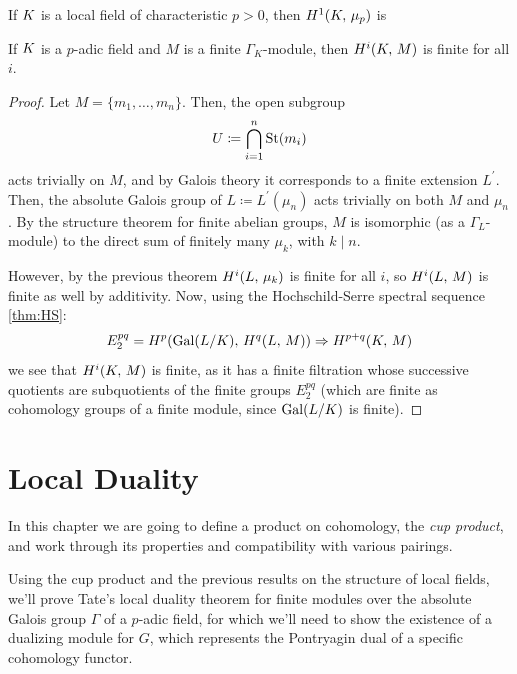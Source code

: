 \documentclass[a4paper, oneside]{memoir}
\begin{document}
\begin{remark}\label{rm:H1CharP}
    If $K$ is a local field of characteristic $p>0$, then $H^{1}( K, \, \mu_p )$ is
\end{remark}

\begin{corollary}\label{cor:FinCohom}
    If $K$ is a $p$-adic field and $M$ is a finite $\Gamma_K$-module, then
    \(H^{i}( K, \, M )\) is finite for all $i$.
\end{corollary}
\begin{proof}
    Let $M=\{m_1,\ldots,m_n\}$. Then, the open subgroup
    \[
        U\coloneqq \bigcap_{i=1}^n{\operatorname{\mathrm{St}}(m_i)}
    \]
    acts trivially on $M$, and by Galois theory it corresponds to a finite extension $L^{\prime} $. Then, the absolute Galois group of $L\coloneqq L^{\prime}(\mu_n)$ acts trivially on both $M$ and $\mu_n$. By the structure theorem for finite abelian groups, $M$ is isomorphic (as a $\Gamma_L$-module) to the direct sum of finitely many $\mu_k$, with $k\mid n$.

    However, by the previous theorem $H^{i}( L, \, \mu_k )$ is finite for all $i$, so $H^{i}( L, \, M )$ is finite as well by additivity. Now, using the Hochschild-Serre spectral sequence \eqref{thm:HS}:
    \[
        E_2^{pq}= H^{p}( \mathrm{Gal}{(L / K)}, \, H^{q}( L, \, M ) ) \Rightarrow H^{p+q}( K, \, M )
    \]
    we see that $H^{i}( K, \, M )$ is finite, as it has a finite filtration whose successive quotients are subquotients of the finite groups $E_2^{pq}$ (which are finite as cohomology groups of a finite module, since $\mathrm{Gal}(L /K)$ is finite).
\end{proof}




\chapter{Local Duality}
In this chapter we are going to define a product on cohomology, the \textit{cup product}, and work through its properties and compatibility with various pairings.

Using the cup product and the previous results on the structure of local fields, we'll prove Tate's local duality theorem for finite modules over the absolute Galois group $\Gamma$ of a $p$-adic field, for which we'll need to show the existence of a dualizing module for $G$, which represents the Pontryagin dual of a specific cohomology functor.
\end{document}

